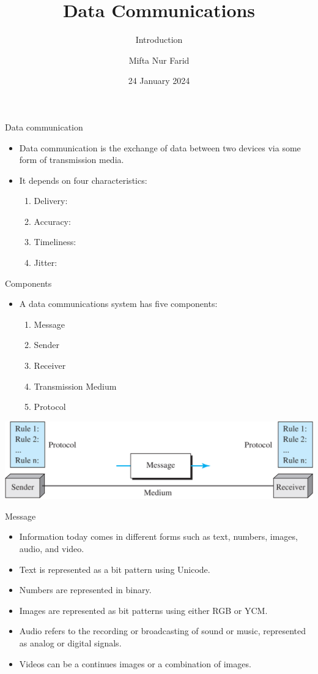 \documentclass[pdflatex,compress]{beamer}
\title{Data Communications}
\subtitle{Introduction}
\author{Mifta Nur Farid}
\date{24 January 2024}
\begin{document}
\maketitle

\begin{frame}{Data communication}
	\begin{itemize}
		\item Data communication is the exchange of data between two devices via some form of transmission media.
		\item It depends on four characteristics:
		\begin{enumerate}
			\item Delivery:
			\item Accuracy:
			\item Timeliness:
			\item Jitter:
		\end{enumerate}
	\end{itemize}
\end{frame}

\begin{frame}{Components}
	\begin{itemize}
		\item A data communications system has five components:
		\begin{enumerate}
			\item Message
			\item Sender
			\item Receiver
			\item Transmission Medium
			\item Protocol 
		\end{enumerate}
	\end{itemize}
	\begin{center}
		\includegraphics[width=\linewidth]{img/01}
	\end{center}
\end{frame}

\begin{frame}{Message}
	\begin{itemize}
		\item Information today comes in different forms such as text, numbers, images, audio, and video.
		\item Text is represented as a bit pattern using Unicode.
		\item Numbers are represented in binary.
		\item Images are represented as bit patterns using either RGB or YCM.
		\item Audio refers to the recording or broadcasting of sound or music, represented as analog or digital signals.
		\item Videos can be a continues images or a combination of images.
	\end{itemize}
\end{frame}
\end{document}
